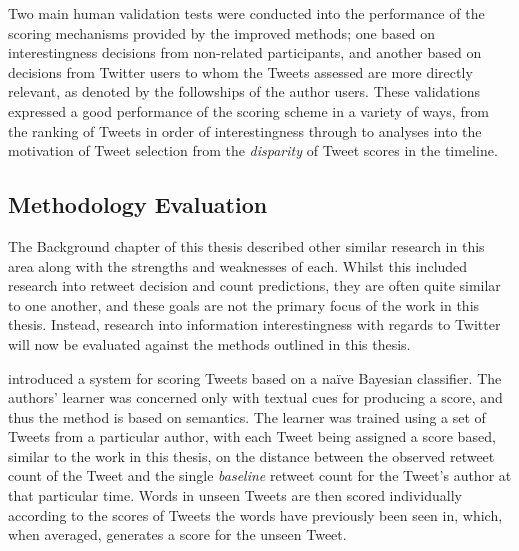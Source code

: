 Two main human validation tests were conducted into the performance of the scoring mechanisms provided by the improved methods; one based on interestingness decisions from non-related participants, and another based on decisions from Twitter users to whom the Tweets assessed are more directly relevant, as denoted by the followships of the author users. These validations expressed a good performance of the scoring scheme in a variety of ways, from the ranking of Tweets in order of interestingness through to analyses into the motivation of Tweet selection from the \textit{disparity} of Tweet scores in the timeline.


\subsection{Methodology Evaluation}
The Background chapter of this thesis described other similar research in this area along with the strengths and weaknesses of each. Whilst this included research into retweet decision and count predictions, they are often quite similar to one another, and these goals are not the primary focus of the work in this thesis. Instead, research into information interestingness with regards to Twitter will now be evaluated against the methods outlined in this thesis.

\citet{gransee12} introduced a system for scoring Tweets based on a na{\"i}ve Bayesian classifier. The authors' learner was concerned only with textual cues for producing a score, and thus the method is based on semantics. The learner was trained using a set of Tweets from a particular author, with each Tweet being assigned a score based, similar to the work in this thesis, on the distance between the observed retweet count of the Tweet and the single \textit{baseline} retweet count for the Tweet's author at that particular time. Words in unseen Tweets are then scored individually according to the scores of Tweets the words have previously been seen in, which, when averaged, generates a score for the unseen Tweet.

